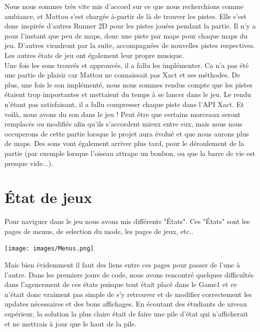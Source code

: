 \documentclass [11pt]{report}
\begin{document}
	\indent Nous nous sommes très vite mis d'accord sur ce que nous recherchions comme ambiance, et Mattou s'est chargée à-partir de là  de trouver les pistes. Elle s'est donc inspirée d'autres Runner 2D pour les pistes jouées pendant la partie. Il n'y a pour l'instant que peu de maps, donc une piste par maps pour chaque maps du jeu. D'autres viendront par la suite, accompagnées de nouvelles pistes respectives. Les autres états de jeu ont également leur propre musique. \\
	
	
	\indent Une fois les sons trouvés et approuvés, il a fallu les implémenter. Ca n'a pas été une partie de plaisir car Mattou ne connaissait pas Xact et ses méthodes. De plus, une fois le son implémenté, nous nous sommes rendus compte que les pistes étaient trop importantes et mettaient du temps à se lancer dans le jeu. Le rendu n'étant pas satisfaisant, il a fallu compresser chaque piste dans l'API Xact. Et voilà, nous avons du son dans le jeu ! Peut être que certains morceaux seront remplacés ou modifiés afin qu'ils s'accordent mieux entre eux, mais nous nous occuperons de cette partie lorsque le projet aura évolué et que nous aurons plus de maps. Des sons vont  également arriver plus tard, pour le déroulement de la partie (par exemple lorsque l'oiseau attrape un bonbon, ou que la barre de vie est presque vide...).
		
		
		\newpage
		
		
		\section{\'Etat de jeux}
		
		\vspace{5mm}
		
		Pour naviguer dans le jeu nous avons mis différents "États". Ces "États" sont les pages de menus, de selection du mode, les pages de jeux, etc.. 
		
		\vspace{8mm}
		
		\begin{center}
			\texttt{[image: images/Menus.png]}
		\end{center}
		
		
		\vspace{10mm}
			 
			 
		
		Mais bien évidemment il faut des liens entre ces pages pour passer de l'une à l'autre. Dans les premiers jours de code, nous avons rencontré quelques difficultés dans l'agencement de ces états puisque tout était placé dans le Game1 et ce n'était donc vraiment pas simple de s'y retrouver et de modifier correctement les updates nécessaires et des bons affichages. En écoutant des étudiants de niveau supérieur, la solution la plus claire était de faire une pile d'état qui n'afficherait et ne mettrais à jour que le haut de la pile.\\
		
\end{document}
